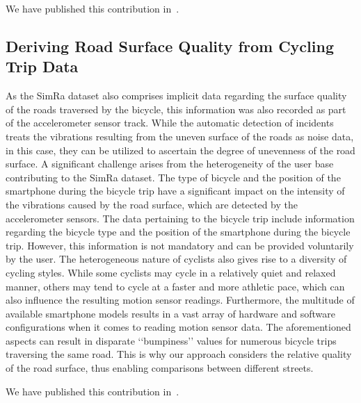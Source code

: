 We have published this contribution in~\cite{karakaya2020simra,karakaya2022cyclesense}.

\subsection{Deriving Road Surface Quality from Cycling Trip Data}
\label{subsec:road_surface_contribution}
As the SimRa dataset also comprises implicit data regarding the surface quality of the roads traversed by the bicycle, this information was also recorded as part of the accelerometer sensor track.
While the automatic detection of incidents treats the vibrations resulting from the uneven surface of the roads as noise data, in this case, they can be utilized to ascertain the degree of unevenness of the road surface.
A significant challenge arises from the heterogeneity of the user base contributing to the SimRa dataset.
The type of bicycle and the position of the smartphone during the bicycle trip have a significant impact on the intensity of the vibrations caused by the road surface, which are detected by the accelerometer sensors.
The data pertaining to the bicycle trip include information regarding the bicycle type and the position of the smartphone during the bicycle trip. However, this information is not mandatory and can be provided voluntarily by the user.
The heterogeneous nature of cyclists also gives rise to a diversity of cycling styles.
While some cyclists may cycle in a relatively quiet and relaxed manner, others may tend to cycle at a faster and more athletic pace, which can also influence the resulting motion sensor readings.
Furthermore, the multitude of available smartphone models results in a vast array of hardware and software configurations when it comes to reading motion sensor data.
The aforementioned aspects can result in disparate ‘‘bumpiness’’ values for numerous bicycle trips traversing the same road.
This is why our approach considers the relative quality of the road surface, thus enabling comparisons between different streets.

We have published this contribution in~\cite{karakaya2023crowdsensing}.


